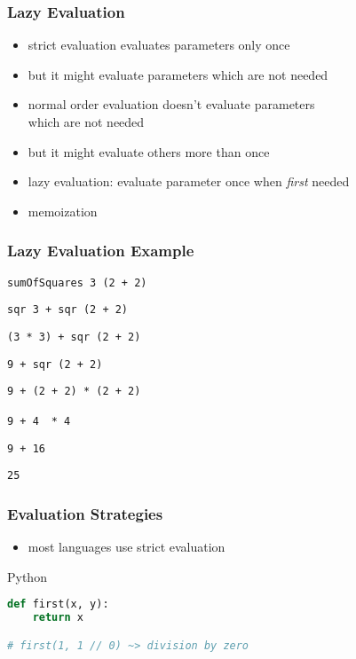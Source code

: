 \documentclass[dvipsnames]{beamer}
\theoremstyle{plain}
\begin{document}
\begin{frame}
  \frametitle{Lazy Evaluation}

  \begin{itemize}
    \item strict evaluation evaluates parameters only once
    \item but it might evaluate parameters which are not needed

    \medskip
    \item normal order evaluation doesn't evaluate parameters\\
      which are not needed
    \item but it might evaluate others more than once

    \pause
    \medskip
    \item \alert{lazy evaluation}: evaluate parameter once when
      \emph{first} needed
    \item \alert{memoization}
  \end{itemize}
\end{frame}

\begin{frame}
  \frametitle{Lazy Evaluation Example}

  \lstinline|sumOfSquares 3 (2 + 2)|

  \pause
  \medskip
  \lstinline|sqr 3 + sqr (2 + 2)|

  \pause
  \medskip
  \lstinline|(3 * 3) + sqr (2 + 2)|

  \pause
  \medskip
  \lstinline|9 + sqr (2 + 2)|

  \pause
  \medskip
  \lstinline|9 + (2 + 2) * (2 + 2)|

  \pause
  \medskip
  \lstinline|9 + 4|\pause~~\lstinline|* 4|

  \pause
  \medskip
  \lstinline|9 + 16|

  \pause
  \medskip
  \lstinline|25|
\end{frame}

\begin{frame}[fragile]
  \frametitle{Evaluation Strategies}

  \begin{itemize}
    \item most languages use strict evaluation
  \end{itemize}

  \begin{exampleblock}{Python}
    \begin{lstlisting}[language=Python]
def first(x, y):
    return x

# first(1, 1 // 0) ~> division by zero
    \end{lstlisting}
  \end{exampleblock}
\end{frame}
\end{document}
